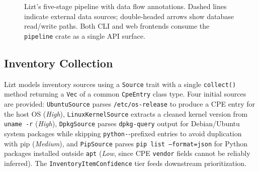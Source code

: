 \documentclass[conference]{IEEEtran}
\begin{document}
\begin{figure}[t]
{
  }
  \caption{Lizt's five-stage pipeline with data flow annotations.
    Dashed lines indicate external data sources; double-headed
    arrows show database read/write paths. Both CLI and web
    frontends consume the \texttt{pipeline} crate as a single
    API surface.}
  \label{fig:pipeline-expanded}
\end{figure}

\subsection{Inventory Collection}
Lizt models inventory sources using a \texttt{Source} trait with a single \texttt{collect()} method returning a \texttt{Vec} of a common \texttt{CpeEntry} class type. Four initial sources are provided: \texttt{UbuntuSource} parses \texttt{/etc/os-release} to produce a CPE entry for the host OS (\emph{High}), \texttt{LinuxKernelSource} extracts a cleaned kernel version from \texttt{uname -r} (\emph{High}), \texttt{DpkgSource} parses \texttt{dpkg-query} output for Debian/Ubuntu system packages while skipping \texttt{python-}-prefixed entries to avoid duplication with pip (\emph{Medium}), and \texttt{PipSource} parses \texttt{pip list --format=json} for Python packages installed outside \texttt{apt} (\emph{Low}, since CPE \texttt{vendor} fields cannot be reliably inferred). The \texttt{InventoryItemConfidence} tier feeds downstream prioritization.
\end{document}
